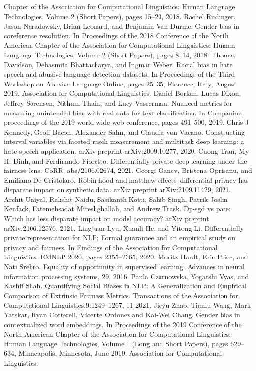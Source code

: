 \documentclass[11pt]{article} %
\begin{document}
\begin{thebibliography}{10}
\begin{small}
Chapter of the Association for Computational Linguistics: Human Language
Technologies, Volume 2 (Short Papers), pages 15–20, 2018.
 Rachel Rudinger, Jason Naradowsky, Brian Leonard, and Benjamin Van Durme. Gender bias in coreference resolution. In Proceedings of the
2018 Conference of the North American Chapter of the Association for Computational Linguistics: Human Language Technologies, Volume 2 (Short Papers), pages 8–14, 2018.
 Thomas Davidson, Debasmita Bhattacharya, and Ingmar Weber. Racial bias in hate speech and abusive language detection datasets. In Proceedings of the Third Workshop on Abusive Language Online, pages 25–35, Florence, Italy, August 2019. Association for Computational Linguistics.
 Daniel Borkan, Lucas Dixon, Jeffrey Sorensen, Nithum Thain, and Lucy Vasserman. Nuanced metrics for measuring unintended bias with real data
for text classification. In Companion proceedings of the 2019 world wide web conference, pages 491–500, 2019.
 Chris J Kennedy, Geoff Bacon, Alexander Sahn, and Claudia von Vacano. Constructing interval variables via faceted rasch measurement and multitask deep learning: a hate speech application. arXiv preprint arXiv:2009.10277, 2020.
 Cuong Tran, My H. Dinh, and Ferdinando Fioretto. Differentially private deep learning under the fairness lens. CoRR, abs/2106.02674, 2021.
 Georgi Ganev, Bristena Oprisanu, and Emiliano De Cristofaro. Robin hood and matthew effects–differential privacy has disparate impact on synthetic data. arXiv preprint arXiv:2109.11429, 2021.
 Archit Uniyal, Rakshit Naidu, Sasikanth Kotti, Sahib Singh, Patrik Joslin Kenfack, Fatemehsadat Mireshghallah, and Andrew Trask. Dp-sgd vs pate:
Which has less disparate impact on model accuracy? arXiv preprint arXiv:2106.12576, 2021.
 Lingjuan Lyu, Xuanli He, and Yitong Li. Differentially private representation for NLP: Formal guarantee and an empirical study on privacy and fairness. In Findings of the Association for Computational Linguistics: EMNLP 2020, pages 2355–2365, 2020.
 Moritz Hardt, Eric Price, and Nati Srebro. Equality of opportunity in supervised learning. Advances in neural information processing systems, 29, 2016.
 Paula Czarnowska, Yogarshi Vyas, and Kashif Shah. Quantifying Social Biases in NLP: A Generalization and Empirical Comparison of Extrinsic Fairness Metrics. Transactions of the Association for Computational Linguistics,9:1249–1267, 11 2021.
 Jieyu Zhao, Tianlu Wang, Mark Yatskar, Ryan Cotterell, Vicente Ordonez,and Kai-Wei Chang. Gender bias in contextualized word embeddings. In
Proceedings of the 2019 Conference of the North American Chapter of the Association for Computational Linguistics: Human Language Technologies, Volume 1 (Long and Short Papers), pages 629–634, Minneapolis, Minnesota, June 2019. Association for Computational Linguistics.


\end{small}
\end{thebibliography}
\end{document}
